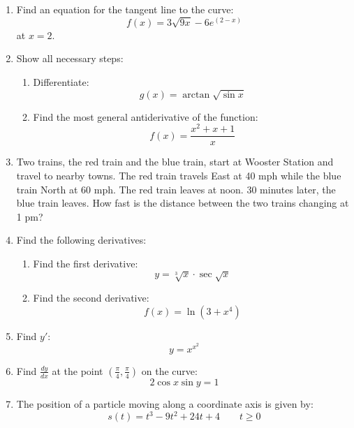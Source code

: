 \documentclass[letterpaper,12pt,fleqn]{article}
\begin{document}
\begin{enumerate}[left=0in]
  \newpage

\item Find an equation for the tangent line to the curve:
  \[f(x)=3\sqrt{9x}-6e^{(2-x)}\]
  at \(x=2\).

  \newpage

\item Show all necessary steps:
  \begin{enumerate}
  \item Differentiate:
    \[g(x) = \arctan\sqrt{\sin x}\]

    \vspace{3in}

  \item Find the most general antiderivative of the function:
    \[f(x) = \dfrac{x^2+x+1}{x}\]
  \end{enumerate}

\item Two trains, the red train and the blue train, start at Wooster Station and travel to nearby towns.  The red
  train travels East at 40 mph while the blue train North at 60 mph.  The red train leaves at noon.  30 minutes
  later, the blue train leaves.  How fast is the distance between the two trains changing at 1 pm?

  \newpage

\item Find the following derivatives:
  \begin{enumerate}
  \item Find the first derivative:
    \[y=\sqrt[3]{x}\cdot\sec\sqrt{x}\]

    \vspace {3in}
  \item Find the second derivative:
    \[f(x)=\ln (3+x^4)\]
  \end{enumerate}

  \newpage

\item Find \(y'\):
  \[y=x^{x^2}\]

  \vspace{3in}

\item Find \(\frac{dy}{dx}\) at the point \((\frac{\pi}{4},\frac{\pi}{4})\) on the curve:
  \[2\cos x\sin y=1\]

  \newpage

\item The position of a particle moving along a coordinate axis is given by:
  \[s(t)=t^3-9t^2+24t+4\qquad t\ge 0\]

  \vspace{0.5in}


\end{enumerate}
\end{document}
